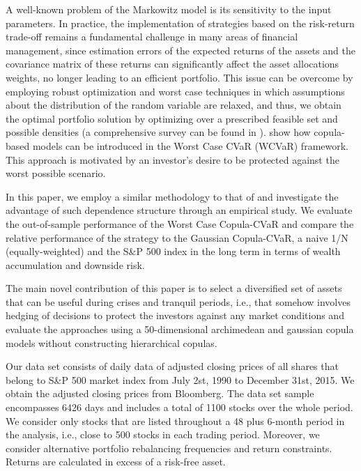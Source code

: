 \documentclass[a4paper,10pt]{article}
\begin{document}
A well-known problem of the Markowitz model is its sensitivity to the input parameters. In practice, the implementation of strategies based on the risk-return trade-off remains a fundamental challenge in many areas of financial management, since estimation errors of the expected returns of the assets and the covariance matrix of these returns can significantly affect the asset allocations weights, no longer leading to an efficient portfolio. This issue can be overcome by employing robust optimization and
worst case techniques \citep{zhu2009worst,polak2010,fertis2012,kakouris14} in which assumptions about the
distribution of the random variable are relaxed, and thus, we obtain the
optimal portfolio solution by optimizing over a prescribed feasible set and
possible densities (a comprehensive survey can be found in \citet*{gabrel2014}). \citet*{kakouris14} show how copula-based models can be
introduced in the Worst Case CVaR (WCVaR) framework. This approach is
motivated by an investor's desire to be protected against the worst possible
scenario.

In this paper, we employ a similar methodology to that of \citet*{kakouris14}
and investigate the advantage of such dependence structure through an
empirical study. We evaluate the out-of-sample performance of the Worst Case Copula-CVaR and compare the relative performance of the strategy to the Gaussian Copula-CVaR, a naive 1/N (equally-weighted) and the S\&P 500
index in the long term in terms of wealth accumulation and downside risk.

The main novel contribution of this paper is to select a diversified set of assets that can be useful during crises and tranquil periods, i.e., that somehow involves hedging of decisions to protect the investors against any market conditions and evaluate the approaches using a 50-dimensional archimedean and gaussian copula models without constructing hierarchical copulas.  

Our data set consists of daily data of adjusted closing prices of all
shares that belong to S\&P 500 market index from July 2st, 1990 to December
31st, 2015. We obtain the adjusted closing prices from Bloomberg. The data
set sample encompasses 6426 days and includes a total of 1100 stocks over
the whole period. We consider only stocks that are listed throughout a 48
plus 6-month period in the analysis, i.e., close to 500 stocks in each
trading period. Moreover, we consider alternative portfolio rebalancing
frequencies and return constraints. Returns are calculated in excess of a risk-free asset.
\end{document}
